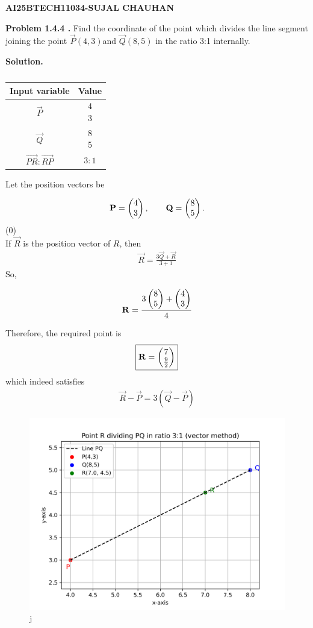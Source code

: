 \documentclass[12pt]{article}
\begin{document}
\begin{center}
    \textbf{\Large AI25BTECH11034-SUJAL CHAUHAN}
\end{center}
\textbf{Problem 1.4.4 .}  
Find the coordinate of the point which divides the line segment joining the point $\vec{P}(4,3) $and $\vec{Q}(8,5)$ in the ratio 3:1 internally.

\textbf{Solution.}  

\begin{table}[H]
\centering
\begin{tabular}[12pt]{ |c| c|}
    \hline
    \textbf{Input variable} & \textbf{Value}\\ 
    \hline
    $\vec{P}$ & \myvec{4 \\3 } \\
    \hline 
    $\vec{Q}$ & \myvec{8 \\ 5}\\
    \hline
    $\vec{PR}:\vec{RP}$ & $3:1$\\
    \hline
    \end{tabular}
    \caption{
    \label{}
    }
 \end{table}
Let the position vectors be

$$
\mathbf{P} = \begin{pmatrix}4\\ 3\end{pmatrix}, \qquad
\mathbf{Q} = \begin{pmatrix}8 \\ 5\end{pmatrix}.
$$
\hfill{(0)} \\

If \(\vec{R}\) is the position vector of \(R\), then
\begin{align}
\vec{R}=\frac{3\vec{Q}+\vec{R}}{3+1}
\end{align}
So,

    


$$    \mathbf{R}
= \frac{3 \begin{pmatrix}8 \\ 5\end{pmatrix} + \begin{pmatrix} 4 \\3\end{pmatrix}}{4}$$



Therefore, the required point is
$$
\boxed{\mathbf{R}=\begin{pmatrix}7 \\ \frac{9}{2}\end{pmatrix}}
$$
which indeed satisfies \begin{align}
    \vec{R} - \vec{P} = 3(\vec{Q} - \vec{P})
\end{align}

\begin{figure}[H]
    \centering
    \includegraphics[width=1\columnwidth]{figures/plot.png}j
    \caption{}
    \label{fig:placeholder}
\end{figure}
\end{document}

